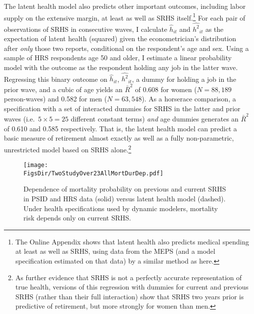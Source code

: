 \documentclass[12pt,pdftex,letterpaper]{article}
\newcommand{\Health}{h}
\newcommand{\RootDir}{..}
\newcommand{\FigsDir}{\RootDir/Figures}
\begin{document}
The latent health model also predicts other important outcomes, including labor supply on the extensive margin, at least as well as SRHS itself.\footnote{The Online Appendix shows that latent health also predicts medical spending at least as well as SRHS, using data from the MEPS (and a model specification estimated on that data) by a similar method as here.} For each pair of observations of SRHS in consecutive waves, I calculate $\widehat{\Health}_{it}$ and $\widehat{\Health^2}_{it}$ as the expectation of latent health (squared) given the econometrician's distribution after \textit{only} those two reports, conditional on the respondent's age and sex. Using a sample of HRS respondents age 50 and older, I estimate a linear probability model with the outcome as the respondent holding any job in the latter wave.  Regressing this binary outcome on $\widehat{\Health}_{it}$,  $\widehat{\Health^2}_{it}$, a dummy for holding a job in the prior wave, and a cubic of age yields an $\bar{R}^2$ of 0.608 for women ($N=88,189$ person-waves) and 0.582 for men ($N=63,548$). As a horserace comparison, a specification with a set of interacted dummies for SRHS in the latter and prior waves (i.e.\ $5 \times 5 = 25$ different constant terms) \textit{and} age dummies generates an $\bar{R}^2$ of 0.610 and 0.585 respectively.  That is, the latent health model can predict a basic measure of retirement almost exactly as well as a fully non-parametric, unrestricted model based on SRHS alone.\footnote{As further evidence that SRHS is not a perfectly accurate representation of true health, versions of this regression with dummies for current and previous SRHS (rather than their full interaction) show that SRHS two years prior is predictive of retirement, but more strongly for women than men.}

\begin{figure}
	\centering
	\texttt{[image: \\FigsDir/TwoStudyOver23AllMortDurDep.pdf]}
	\caption{Dependence of mortality probability on previous and current SRHS in PSID and HRS data (solid) versus latent health model (dashed). Under health specifications used by dynamic modelers, mortality risk depends only on current SRHS.}\label{fig:MortDurDep}
\end{figure}
\end{document}
